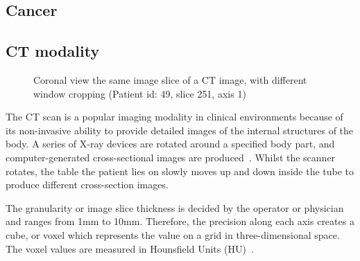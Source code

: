 \documentclass[12pt,twoside]{report}
\begin{document}
\subsection{Cancer}

\subsection{CT modality}

\begin{figure}[H]
    \centering
    \caption{Coronal view the same image slice of a CT image, with different window cropping (Patient id: 49, slice 251, axis 1)}
    \label{fig:ct-windows}
\end{figure}

The CT scan is a popular imaging modality in clinical environments because of its non-invasive ability to provide detailed images of the internal structures of the body. A series of X-ray devices are rotated around a specified body part, and computer-generated cross-sectional images are produced~\cite{file-formats}. Whilst the scanner rotates, the table the patient lies on slowly moves up and down inside the tube to produce different cross-section images. 

The granularity or image slice thickness is decided by the operator or physician and ranges from 1mm to 10mm. Therefore, the precision along each axis creates a cube, or voxel which represents the value on a grid in three-dimensional space. The voxel values are measured in Hounsfield Units (HU)~\cite{diagnostic-radiology-physics}. 
\end{document}
